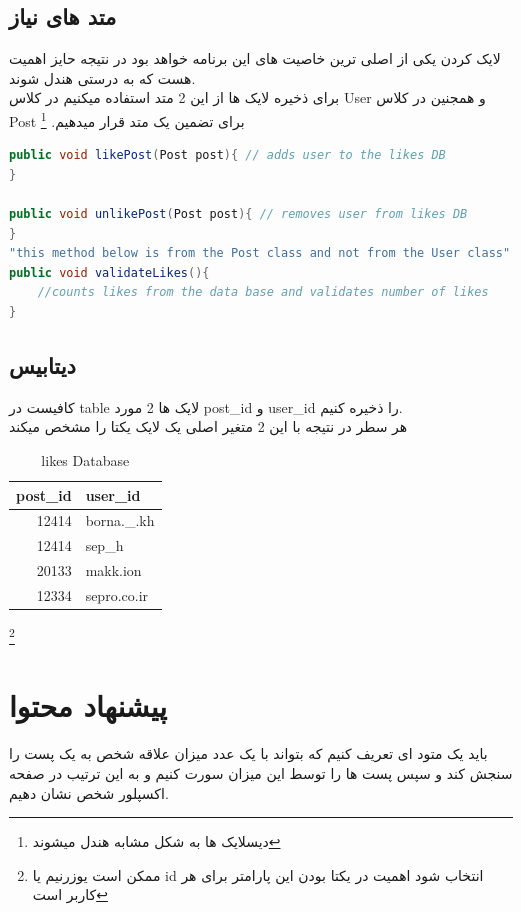 \documentclass[12pt]{article}
\begin{document}
\subsection{متد های نیاز}
لایک کردن یکی از اصلی ترین  خاصیت های این برنامه خواهد بود
در نتیجه حایز اهمیت هست که به درستی هندل شوند.\\
برای ذخیره لایک ها از این 2 متد استفاده میکنیم در کلاس User و
همجنین در کلاس Post برای تضمین یک متد قرار میدهیم.
\footnote{دیسلایک ها به شکل مشابه هندل میشوند}
\begin{latin}
    \begin{lstlisting}[language=Java, caption={Post class},label={lst:code}, mathescape=true, breaklines=true]
public void likePost(Post post){ // adds user to the likes DB
}

public void unlikePost(Post post){ // removes user from likes DB
}
"this method below is from the Post class and not from the User class"
public void validateLikes(){
    //counts likes from the data base and validates number of likes
}

    \end{lstlisting}
\end{latin}
\subsection{دیتابیس}
کافیست در table لایک ها 2 مورد post\_id و user\_id را
ذخیره کنیم.\\
هر سطر در نتیجه با این 2 متغیر اصلی یک لایک یکتا را مشخص میکند
\begin{latin}
    \begin{table}[h]
        \centering
        \begin{tabular}{|r|l|}
            \hline
            post\_id & user\_id    \\
            \hline
            12414    & borna.\_.kh \\
            12414    & sep\_h      \\
            20133    & makk.ion    \\
            12334    & sepro.co.ir \\
            \hline
        \end{tabular}
        \caption{likes Database}
    \end{table}
\end{latin}
\footnote{ممکن است یوزرنیم یا id انتخاب شود اهمیت در
    یکتا بودن این پارامتر برای هر کاربر است}
\pagebreak
\section{پیشنهاد محتوا}
باید یک متود ای تعریف کنیم که بتواند با یک عدد میزان
علاقه شخص به یک پست را سنجش کند و سپس پست ها را توسط این میزان
سورت کنیم و به این ترتیب در صفحه اکسپلور شخص نشان دهیم.\\
\end{document}
